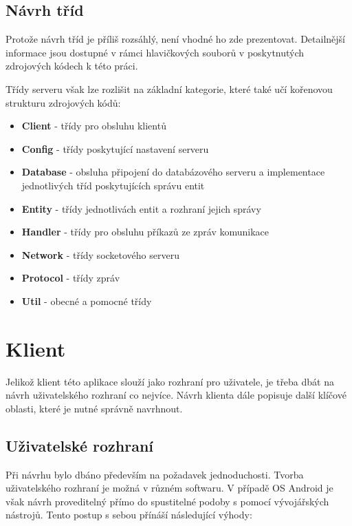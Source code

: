 \documentclass[thesis=B,czech]{FITthesis}[2013/10/20]
\begin{document}
\subsection{Návrh tříd}

Protože návrh tříd je příliš rozsáhlý, není vhodné ho zde prezentovat. Detailnější informace jsou dostupné v rámci hlavičkových souborů v poskytnutých zdrojových kódech k této práci.

Třídy serveru však lze rozlišit na základní kategorie, které také učí kořenovou strukturu zdrojových kódů:

\begin{itemize}
  \item{\textbf{Client} - třídy pro obsluhu klientů}
  \item{\textbf{Config} - třídy poskytující nastavení serveru}
  \item{\textbf{Database} - obsluha připojení do databázového serveru a implementace jednotlivých tříd poskytujících správu entit}
  \item{\textbf{Entity} - třídy jednotlivách entit a rozhraní jejich správy}
  \item{\textbf{Handler} - třídy pro obsluhu příkazů ze zpráv komunikace}
  \item{\textbf{Network} - třídy socketového serveru}
  \item{\textbf{Protocol} - třídy zpráv}
  \item{\textbf{Util} - obecné a pomocné třídy}
\end{itemize}

\section{Klient}

Jelikož klient této aplikace slouží jako rozhraní pro uživatele, je třeba dbát na návrh uživatelského rozhraní co nejvíce. Návrh klienta dále popisuje další klíčové oblasti, které je nutné správně navrhnout.

\subsection{Uživatelské rozhraní}

Při návrhu bylo dbáno především na požadavek jednoduchosti. Tvorba uživatelského rozhraní je možná v různém softwaru. V případě OS Android je však návrh proveditelný přímo do spustitelné podoby s pomocí vývojářských nástrojů. Tento postup s sebou přínáší následující výhody:
\end{document}
